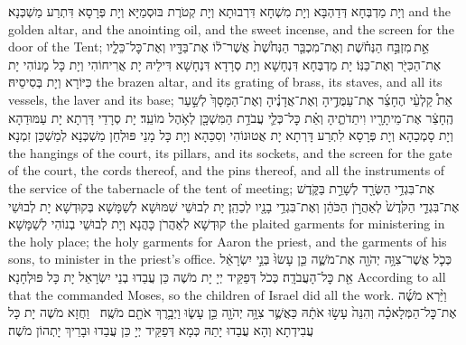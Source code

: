 {וְיָת מַדְבְּחָא דְּדַהְבָּא וְיָת מִשְׁחָא דִּרְבוּתָא וְיָת קְטֹרֶת בּוּסְמַיָּא וְיָת פְּרָסָא דִּתְרַע מַשְׁכְּנָא׃}
{and the golden altar, and the anointing oil, and the sweet incense, and the screen for the door of the Tent;}{}
{אֵ֣ת \legarmeh  מִזְבַּ֣ח הַנְּחֹ֗שֶׁת וְאֶת־מִכְבַּ֤ר הַנְּחֹ֙שֶׁת֙ אֲשֶׁר־ל֔וֹ אֶת־בַּדָּ֖יו וְאֶת־כׇּל־כֵּלָ֑יו אֶת־הַכִּיֹּ֖ר וְאֶת־כַּנּֽוֹ׃}
{יָת מַדְבְּחָא דִּנְחָשָׁא וְיָת סְרָדָא דִּנְחָשָׁא דִּילֵיהּ יָת אֲרִיחוֹהִי וְיָת כָּל מָנוֹהִי יָת כִּיּוֹרָא וְיָת בְּסִיסֵיהּ׃}
{the brazen altar, and its grating of brass, its staves, and all its vessels, the laver and its base;}{}
{אֵת֩ קַלְעֵ֨י הֶחָצֵ֜ר אֶת־עַמֻּדֶ֣יהָ וְאֶת־אֲדָנֶ֗יהָ וְאֶת־הַמָּסָךְ֙ לְשַׁ֣עַר הֶֽחָצֵ֔ר אֶת־מֵיתָרָ֖יו וִיתֵדֹתֶ֑יהָ וְאֵ֗ת כׇּל־כְּלֵ֛י עֲבֹדַ֥ת הַמִּשְׁכָּ֖ן לְאֹ֥הֶל מוֹעֵֽד׃}
{יָת סְרָדֵי דָּרְתָא יָת עַמּוּדַהָא וְיָת סָמְכַהָא וְיָת פְּרָסָא לִתְרַע דָּרְתָא יָת אֲטוּנוֹהִי וְסִכַּהָא וְיָת כָּל מָנֵי פּוּלְחַן מַשְׁכְּנָא לְמַשְׁכַּן זִמְנָא׃}
{the hangings of the court, its pillars, and its sockets, and the screen for the gate of the court, the cords thereof, and the pins thereof, and all the instruments of the service of the tabernacle of the tent of meeting;}{}
{אֶת־בִּגְדֵ֥י הַשְּׂרָ֖ד לְשָׁרֵ֣ת בַּקֹּ֑דֶשׁ אֶת־בִּגְדֵ֤י הַקֹּ֙דֶשׁ֙ לְאַהֲרֹ֣ן הַכֹּהֵ֔ן וְאֶת־בִּגְדֵ֥י בָנָ֖יו לְכַהֵֽן׃}
{יָת לְבוּשֵׁי שִׁמּוּשָׁא לְשַׁמָּשָׁא בְּקוּדְשָׁא יָת לְבוּשֵׁי קוּדְשָׁא לְאַהֲרֹן כָּהֲנָא וְיָת לְבוּשֵׁי בְנוֹהִי לְשַׁמָּשָׁא׃}
{the plaited garments for ministering in the holy place; the holy garments for Aaron the priest, and the garments of his sons, to minister in the priest’s office.}{}
{כְּכֹ֛ל אֲשֶׁר־צִוָּ֥ה יְהֹוָ֖ה אֶת־מֹשֶׁ֑ה כֵּ֤ן עָשׂוּ֙ בְּנֵ֣י יִשְׂרָאֵ֔ל אֵ֖ת כׇּל־הָעֲבֹדָֽה׃}
{כְּכֹל דְּפַקֵּיד יְיָ יָת מֹשֶׁה כֵּן עֲבַדוּ בְנֵי יִשְׂרָאֵל יָת כָּל פּוּלְחָנָא׃}
{According to all that the \lord\space commanded Moses, so the children of Israel did all the work.}{}
{וַיַּ֨רְא מֹשֶׁ֜ה אֶת־כׇּל־הַמְּלָאכָ֗ה וְהִנֵּה֙ עָשׂ֣וּ אֹתָ֔הּ כַּאֲשֶׁ֛ר צִוָּ֥ה יְהֹוָ֖ה כֵּ֣ן עָשׂ֑וּ וַיְבָ֥רֶךְ אֹתָ֖ם מֹשֶֽׁה׃ \petucha 
{}}
{וַחֲזָא מֹשֶׁה יָת כָּל עֲבִידְתָא וְהָא עֲבַדוּ יָתַהּ כְּמָא דְּפַקֵּיד יְיָ כֵּן עֲבַדוּ וּבָרֵיךְ יָתְהוֹן מֹשֶׁה׃}
